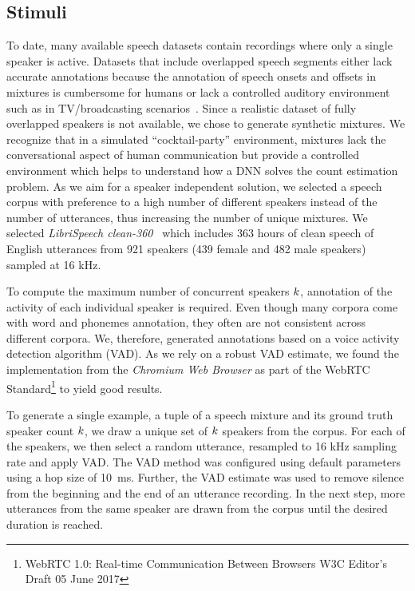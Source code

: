 \subsection{Stimuli}%
\label{ssec:stimuli}
To date, many available speech datasets contain recordings where only a single speaker is active.
Datasets that include overlapped speech segments either lack accurate annotations because the annotation of speech onsets and offsets in mixtures is cumbersome for humans or lack a controlled auditory environment such as in TV/broadcasting scenarios~\cite{Gravier12}.
Since a realistic dataset of fully overlapped speakers is not available, we chose to generate synthetic mixtures.
We recognize that in a simulated ``cocktail-party'' environment, mixtures lack the conversational aspect of human communication but provide a controlled environment which helps to understand how a DNN solves the count estimation problem.
As we aim for a speaker independent solution, we selected a speech corpus with preference to a high number of different speakers instead of the number of utterances, thus increasing the number of unique mixtures.
We selected \emph{LibriSpeech clean-360}~\cite{panayotov15} which includes 363 hours of clean speech of English utterances from 921 speakers (439 female and 482 male speakers) sampled at 16 kHz.
\par
To compute the maximum number of concurrent speakers \(k\), annotation of the activity of each individual speaker is required.
Even though many corpora come with word and phonemes annotation, they often are not consistent across different corpora.
We, therefore, generated annotations based on a voice activity detection algorithm (VAD). As we rely on a robust VAD estimate, we found the implementation from the \emph{Chromium Web Browser} as part of the WebRTC Standard\footnote{WebRTC 1.0: Real-time Communication Between Browsers W3C Editor's Draft 05 June 2017} to yield good results.
\par
To generate a single example, a tuple of a speech mixture and its ground truth speaker count \(k \), we draw a unique set of \(k \) speakers from the corpus.
For each of the speakers, we then select a random utterance, resampled to 16 kHz sampling rate and apply VAD.\@
The VAD method was configured using default parameters using a hop size of \SI{10}{\milli\second}.
Further, the VAD estimate was used to remove silence from the beginning and the end of an utterance recording.
In the next step, more utterances from the same speaker are drawn from the corpus until the desired duration is reached.

